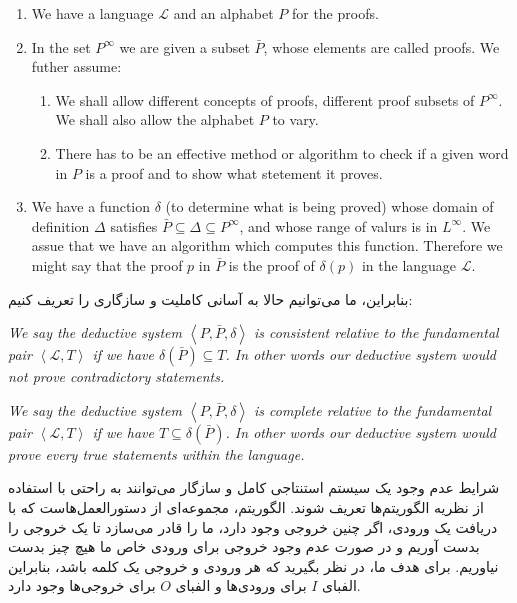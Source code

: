 \documentclass[10pt,a4paper]{article}
\newcommand{\curveL}{\mathcal{L}}
\begin{document}
                        \begin{enumerate}
                            \item We have a language $\curveL$ and an alphabet $P$ for the proofs. 
                            \item In the set $P^\infty$ we are given a subset $\bar P$, whose elements are called proofs. We futher assume:
                            \begin{enumerate}
                                \item We shall allow different concepts of proofs, different proof subsets of $P^\infty$. We shall also allow the alphabet $P$ to vary.
                                \item There has to be an effective method or algorithm to check if a given word in $P$ is a proof and to show what stetement it proves.
                            \end{enumerate}
                            \item We have a function $\delta$ (to determine what is being proved) whose domain of definition $\Delta$ satisfies $\bar P\subseteq \Delta\subseteq P^\infty$, and whose range of valurs is in $L^\infty$. We assue that we have an algorithm which computes this function. Therefore we might say that the proof $p$ in $\bar P$ is the proof of $\delta(p)$ in the language $\curveL$.
                        \end{enumerate}
بنابراین، ما می‌توانیم حالا به آسانی کاملیت و سازگاری را تعریف کنیم:
                        \begin{define}
                            \textit{We say the deductive system $\left<P,\bar P, \delta\right>$ is consistent relative to the fundamental pair $\left<\curveL,T\right>$ if we have $\delta(\bar P) \subseteq T$. In other words our deductive system would not prove contradictory statements.}
                        \end{define}
                        \begin{define}
                            \textit{We say the deductive system $\left<P,\bar P, \delta\right>$ is complete relative to the fundamental pair $\left<\curveL,T\right>$ if we have $T \subseteq \delta(\bar P)$. In other words our deductive system would prove every true statements within the language.}
                        \end{define}
شرایط عدم وجود یک سیستم استنتاجی کامل و سازگار می‌توانند به راحتی با استفاده از نظریه الگوریتم‌ها تعریف شوند. الگوریتم، مجموعه‌ای از دستورالعمل‌هاست که با دریافت یک ورودی، اگر چنین خروجی وجود دارد، ما را قادر می‌سازد تا یک خروجی را بدست آوریم و در صورت عدم وجود خروجی برای ورودی خاص ما هیچ چیز بدست نیاوریم. برای هدف ما، در نظر بگیرید که هر ورودی و خروجی یک کلمه باشد، بنابراین الفبای $I$ برای ورودی‌ها و الفبای $O$ برای خروجی‌ها وجود دارد.
\end{document}
